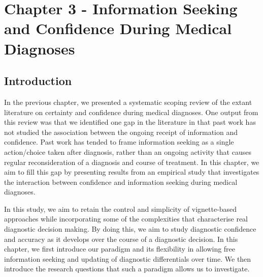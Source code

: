 \documentclass[a4paper, nobind]{templates/ociamthesis}
\begin{document}
\chapter*{Chapter 3 - Information Seeking and Confidence During Medical Diagnoses}\label{chapter-3---information-seeking-and-confidence-during-medical-diagnoses}

\adjustmtc
{}

\section*{Introduction}\label{introduction-1}

In the previous chapter, we presented a systematic scoping review of the extant literature on certainty and confidence during medical diagnoses. One output from this review was that we identified one gap in the literature in that past work has not studied the association between the ongoing receipt of information and confidence. Past work has tended to frame information seeking as a single action/choice taken after diagnosis, rather than an ongoing activity that causes regular reconsideration of a diagnosis and course of treatment. In this chapter, we aim to fill this gap by presenting results from an empirical study that investigates the interaction between confidence and information seeking during medical diagnoses.

\hfill\break
In this study, we aim to retain the control and simplicity of vignette-based approaches while incorporating some of the complexities that characterise real diagnostic decision making. By doing this, we aim to study diagnostic confidence and accuracy as it develops over the course of a diagnostic decision. In this chapter, we first introduce our paradigm and its flexibility in allowing free information seeking and updating of diagnostic differentials over time. We then introduce the research questions that such a paradigm allows us to investigate.
\end{document}
